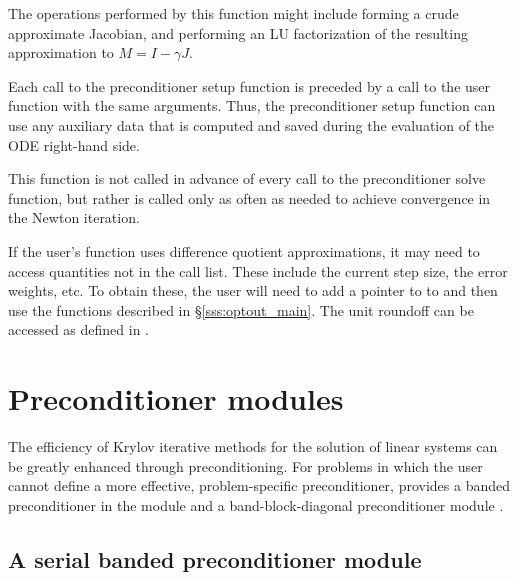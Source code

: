 {
  The operations performed by this function might include forming a crude 
  approximate Jacobian, and performing an LU factorization of the resulting
  approximation to $M=I - \gamma J$.

  Each call to the preconditioner setup function is preceded by a call to     
  the  user function with the same  arguments.  
  Thus, the preconditioner setup function can use any auxiliary data that is 
  computed and saved during the evaluation of the ODE right-hand side.
  
  This function is not called in advance of every call to the preconditioner
  solve function, but rather is called only as often as needed to achieve
  convergence in the Newton iteration. 

  If the user's  function uses difference quotient
  approximations, it may need to access quantities not in the call
  list. These include the current step size, the error weights, etc.
  To obtain these, the user will need to add a pointer to  
  to  and then use the  functions described in
  \S\ref{sss:optout_main}. The unit roundoff can be accessed as
   defined in .
}


\section{Preconditioner modules}\label{ss:preconds}

The efficiency of Krylov iterative methods for the solution of linear systems 
can be greatly enhanced through preconditioning. For problems in which the 
user cannot define a more effective, problem-specific preconditioner,
{\cvode} provides a banded preconditioner in the module {\cvbandpre} and
a band-block-diagonal preconditioner module {\cvbbdpre}.

\subsection{A serial banded preconditioner module}\label{sss:cvbandpre}


